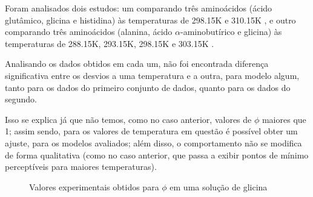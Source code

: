 \documentclass[
	12pt,				%
	openright,
	twoside,
	a4paper,			%
	english,			%
	french,				%
	spanish,			%
	brazil				%
	]{abntex2}
\begin{document}
Foram analisados dois estudos: um comparando três aminoácidos (ácido glutâmico,
glicina e histidina) às temperaturas de 298.15K e 310.15K \cite{tsurko2007}, e
outro comparando três aminoácidos (alanina, ácido $\alpha$-aminobutírico e glicina)
às temperaturas de 288.15K, 293.15K, 298.15K e 303.15K \cite{romero2006}.

Analisando os dados obtidos em cada um, não foi encontrada diferença significativa
entre os desvios a uma temperatura e a outra, para modelo algum, tanto para os
dados do primeiro conjunto de dados, quanto para os dados do segundo.

Isso se explica já que não temos, como no caso anterior, valores de $\phi$ maiores
que 1; assim sendo, para os valores de temperatura em questão é possível obter
um ajuste, para os modelos avaliados; além disso, o comportamento não se modifica
de forma qualitativa (como no caso anterior, que passa a exibir pontos de mínimo
perceptíveis para maiores temperaturas).

\begin{figure}[h]
	\centering
	\caption{Valores experimentais obtidos para $\phi$ em uma solução de glicina}
	\label{fig_temp_amins}
\end{figure}
\end{document}
